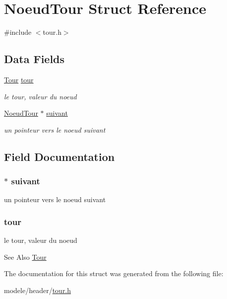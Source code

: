 \hypertarget{struct_noeud_tour}{\section{Noeud\-Tour Struct Reference}
\label{struct_noeud_tour}
}


{\ttfamily \#include $<$tour.\-h$>$}

\subsection*{Data Fields}
\begin{DoxyCompactItemize}
\item 
\hyperlink{struct_tour}{Tour} \hyperlink{struct_noeud_tour_aef560e80e24ff2b98e886ca1a16e638f}{tour}
\begin{DoxyCompactList}\small\item\em le tour, valeur du noeud \end{DoxyCompactList}\item 
\hyperlink{struct_noeud_tour}{Noeud\-Tour} $\ast$ \hyperlink{struct_noeud_tour_a0df95fa7365b6cf3190d366c6ec7b1f6}{suivant}
\begin{DoxyCompactList}\small\item\em un pointeur vers le noeud suivant \end{DoxyCompactList}\end{DoxyCompactItemize}


\subsection{Field Documentation}
\hypertarget{struct_noeud_tour_a0df95fa7365b6cf3190d366c6ec7b1f6}{
\subsubsection[{suivant}]{$\ast$ suivant}}\label{struct_noeud_tour_a0df95fa7365b6cf3190d366c6ec7b1f6}


un pointeur vers le noeud suivant 

\hypertarget{struct_noeud_tour_aef560e80e24ff2b98e886ca1a16e638f}{
\subsubsection[{tour}]{ tour}}\label{struct_noeud_tour_aef560e80e24ff2b98e886ca1a16e638f}


le tour, valeur du noeud 

\begin{DoxySeeAlso}{See Also}
\hyperlink{struct_tour}{Tour} 
\end{DoxySeeAlso}


The documentation for this struct was generated from the following file\-:\begin{DoxyCompactItemize}
\item 
modele/header/\hyperlink{tour_8h}{tour.\-h}\end{DoxyCompactItemize}
